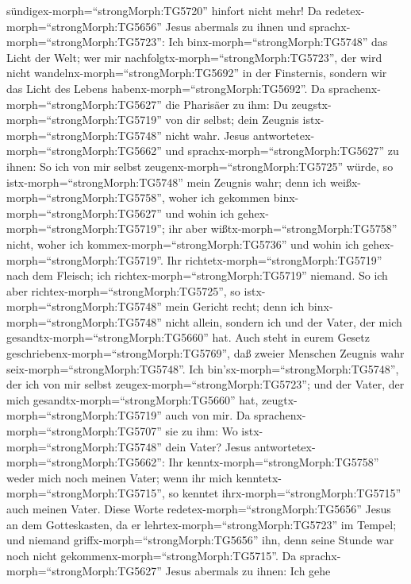 sündigex-morph=``strongMorph:TG5720'' hinfort nicht mehr! 
Da redetex-morph=``strongMorph:TG5656'' Jesus abermals zu ihnen und
sprachx-morph=``strongMorph:TG5723'': Ich
binx-morph=``strongMorph:TG5748'' das Licht der Welt; wer mir
nachfolgtx-morph=``strongMorph:TG5723'', der wird nicht
wandelnx-morph=``strongMorph:TG5692'' in der Finsternis, sondern wir das
Licht des Lebens habenx-morph=``strongMorph:TG5692''.  Da
sprachenx-morph=``strongMorph:TG5627'' die Pharisäer zu ihm: Du
zeugstx-morph=``strongMorph:TG5719'' von dir selbst; dein Zeugnis
istx-morph=``strongMorph:TG5748'' nicht wahr.  Jesus
antwortetex-morph=``strongMorph:TG5662'' und
sprachx-morph=``strongMorph:TG5627'' zu ihnen: So ich von mir selbst
zeugenx-morph=``strongMorph:TG5725'' würde, so
istx-morph=``strongMorph:TG5748'' mein Zeugnis wahr; denn ich
weißx-morph=``strongMorph:TG5758'', woher ich gekommen
binx-morph=``strongMorph:TG5627'' und wohin ich
gehex-morph=``strongMorph:TG5719''; ihr aber
wißtx-morph=``strongMorph:TG5758'' nicht, woher ich
kommex-morph=``strongMorph:TG5736'' und wohin ich
gehex-morph=``strongMorph:TG5719''.  Ihr
richtetx-morph=``strongMorph:TG5719'' nach dem Fleisch; ich
richtex-morph=``strongMorph:TG5719'' niemand.  So ich aber
richtex-morph=``strongMorph:TG5725'', so
istx-morph=``strongMorph:TG5748'' mein Gericht recht; denn ich
binx-morph=``strongMorph:TG5748'' nicht allein, sondern ich und der
Vater, der mich gesandtx-morph=``strongMorph:TG5660'' hat. 
Auch steht in eurem Gesetz geschriebenx-morph=``strongMorph:TG5769'',
daß zweier Menschen Zeugnis wahr seix-morph=``strongMorph:TG5748''.
 Ich bin'sx-morph=``strongMorph:TG5748'', der ich von mir
selbst zeugex-morph=``strongMorph:TG5723''; und der Vater, der mich
gesandtx-morph=``strongMorph:TG5660'' hat,
zeugtx-morph=``strongMorph:TG5719'' auch von mir.  Da
sprachenx-morph=``strongMorph:TG5707'' sie zu ihm: Wo
istx-morph=``strongMorph:TG5748'' dein Vater? Jesus
antwortetex-morph=``strongMorph:TG5662'': Ihr
kenntx-morph=``strongMorph:TG5758'' weder mich noch meinen Vater; wenn
ihr mich kenntetx-morph=``strongMorph:TG5715'', so kenntet
ihrx-morph=``strongMorph:TG5715'' auch meinen Vater.  Diese
Worte redetex-morph=``strongMorph:TG5656'' Jesus an dem Gotteskasten, da
er lehrtex-morph=``strongMorph:TG5723'' im Tempel; und niemand
griffx-morph=``strongMorph:TG5656'' ihn, denn seine Stunde war noch
nicht gekommenx-morph=``strongMorph:TG5715''.  Da
sprachx-morph=``strongMorph:TG5627'' Jesus abermals zu ihnen: Ich gehe
